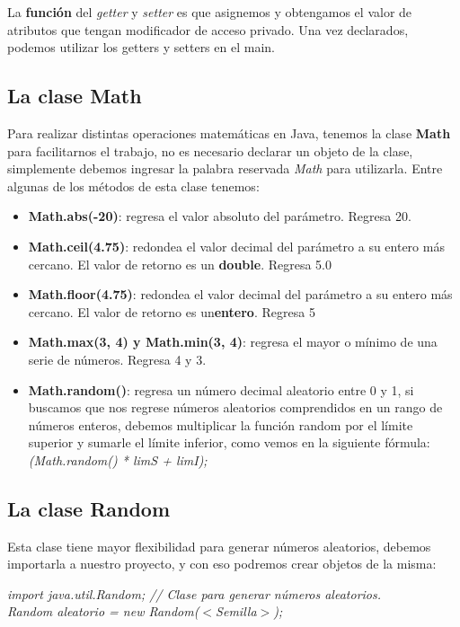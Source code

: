 La \textbf{función} del \textit{getter} y \textit{setter} es que asignemos y obtengamos el valor de atributos que tengan modificador de acceso privado. Una vez declarados, podemos utilizar los getters y setters en el main.


\subsection{La clase Math}
\hspace{0.55cm}Para realizar distintas operaciones matemáticas en Java, tenemos la clase \textbf{Math} para facilitarnos el trabajo, no es necesario declarar un objeto de la clase, simplemente debemos ingresar la palabra reservada \textit{Math} para utilizarla. Entre algunas de los métodos de esta clase tenemos:
\begin{itemize}
    \item \textbf{Math.abs(-20)}: regresa el valor absoluto del parámetro. Regresa 20.
    \item \textbf{Math.ceil(4.75)}: redondea el valor decimal del parámetro a su entero más cercano. El valor de retorno es un \textbf{double}. Regresa 5.0
    \item \textbf{Math.floor(4.75)}: redondea el valor decimal del parámetro a su entero más cercano. El valor de retorno es un\textbf{entero}. Regresa 5
    \item \textbf{Math.max(3, 4) y Math.min(3, 4)}: regresa el mayor o mínimo de una serie de números. Regresa 4 y 3.
    \item \textbf{Math.random()}: regresa un número decimal aleatorio entre 0 y 1, si buscamos que nos regrese números aleatorios comprendidos en un rango de números enteros, debemos multiplicar la función random por el límite superior y sumarle el límite inferior, como vemos en la siguiente fórmula: \textit{(Math.random() * limS + limI);}
\end{itemize}


\subsection{La clase Random}
\hspace{0.55cm}Esta clase tiene mayor flexibilidad para generar números aleatorios, debemos importarla a nuestro proyecto, y con eso podremos crear objetos de la misma:
\begin{center}
	\textit{
		import java.util.Random; // Clase para generar números aleatorios. \\
		Random aleatorio = new Random($<$Semilla$>$);
	}
\end{center}

